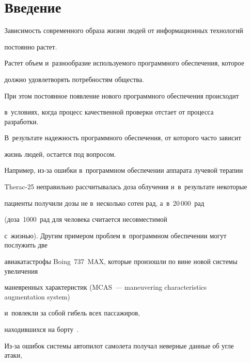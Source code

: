  \thispagestyle{headings}


 










\section{Введение}





Зависимость современного образа жизни людей от информационных технологий 


по\-сто\-ян\-но рас\-тет.


Растет объем и~разнообразие ис\-поль\-зу\-емо\-го программного обеспечения, которое


долж\-но удовле\-тво\-рять по\-треб\-но\-стям общества.


При этом по\-сто\-ян\-ное по\-яв\-ле\-ние нового программного обеспечения происходит 


в~условиях, когда  процесс качественной проверки отстает от процесса разработки.


В~результате на\-деж\-ность программного обеспечения, от которого час\-то зависит 


жизнь людей, остается под вопросом.


Например, из-за ошиб\-ки в~программном обеспечении аппарата лучевой терапии 


Therac-25 неправильно рас\-счи\-ты\-ва\-лась доза облучения и~в~результате некоторые 


пациенты получили дозы не в~несколько сотен рад, а~в~20\,000~рад~\cite{Leveson:1993} 


(доза~1000~рад для человека считается не\-совмес\-ти\-мой 


с~жизнью). Другим примером проб\-лем в~программном обеспечении могут послужить две 


авиакатастрофы Boing~737~MAX, которые произошли по вине новой сис\-те\-мы увеличения 


ма\-нев\-рен\-ных ха\-рак\-те\-ри\-стик (MCAS~--- maneuvering characteristics augmentation system) 


и~по\-влек\-ли за собой гибель всех пассажиров, 


находившихся на борту~\cite{MCAS}.


Из-за ошибок сис\-те\-мы автопилот самолета получал неверные данные об угле атаки, 


